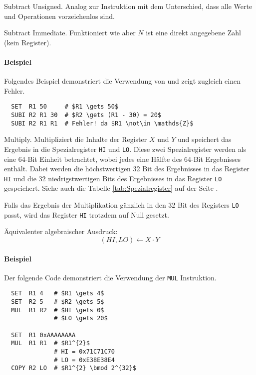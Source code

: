 \glqq Subtract Unsigned\grqq.
Analog zur Instruktion  mit dem Unterschied, dass alle Werte und
Operationen vorzeichenlos sind.



\glqq Subtract Immediate\grqq.
Funktioniert wie  aber $N$ ist eine direkt angegebene Zahl
(kein Register).

\paragraph{Beispiel}
Folgendes Beispiel demonstriert die Verwendung von  und zeigt
zugleich einen Fehler.
\begin{lstlisting}
  SET  R1 50     # $R1 \gets 50$
  SUBI R2 R1 30  # $R2 \gets (R1 - 30) = 20$
  SUBI R2 R1 R1  # Fehler! da $R1 \not\in \mathds{Z}$
\end{lstlisting}



\glqq Multiply\grqq. 
Multipliziert die Inhalte der Register $X$ und $Y$ und speichert das Ergebnis in
die Spezialregister \texttt{HI} und \texttt{LO}. Diese zwei Spezialregister
werden als eine 64-Bit Einheit betrachtet, wobei jedes eine Hälfte des
64-Bit Ergebnisses enthält.
Dabei werden die höchstwertigen 32 Bit des Ergebnisses in das Register
\texttt{HI}
und die 32 niedrigstwertigen Bits des Ergebnisses in das Register
\texttt{LO} gespeichert.
Siehe auch die Tabelle \ref{tab:Spezialregister} auf der Seite
\pageref{tab:Spezialregister}.

Falls das Ergebnis der Multiplikation gänzlich in den 32 Bit des Registers
\texttt{LO} passt, wird das Register \texttt{HI} trotzdem auf Null gesetzt.

Äquivalenter algebraischer Ausdruck:
\[
    (HI, LO) \gets X \cdot Y
\]

\paragraph{Beispiel} Der folgende Code demonstriert die Verwendung der
\texttt{MUL} Instruktion.
\begin{lstlisting}
  SET  R1 4   # $R1 \gets 4$
  SET  R2 5   # $R2 \gets 5$
  MUL  R1 R2  # $HI \gets 0$
              # $LO \gets 20$

  SET  R1 0xAAAAAAAA
  MUL  R1 R1  # $R1^{2}$
              # HI = 0x71C71C70
              # LO = 0xE38E38E4 
  COPY R2 LO  # $R1^{2} \bmod 2^{32}$ 
\end{lstlisting}




